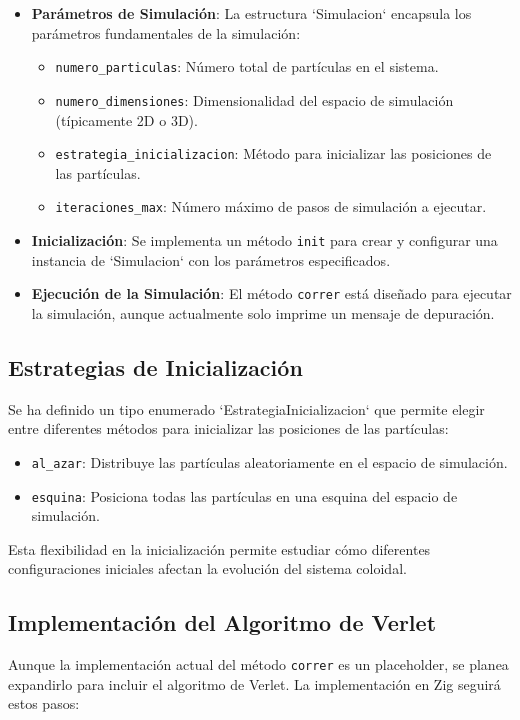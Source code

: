 \documentclass[twocolumn]{article}
\begin{document}
\begin{itemize}
    \item \textbf{Parámetros de Simulación}: La estructura `Simulacion` encapsula los parámetros fundamentales de la simulación:
    \begin{itemize}
        \item \texttt{numero\_particulas}: Número total de partículas en el sistema.
        \item \texttt{numero\_dimensiones}: Dimensionalidad del espacio de simulación (típicamente 2D o 3D).
        \item \texttt{estrategia\_inicializacion}: Método para inicializar las posiciones de las partículas.
        \item \texttt{iteraciones\_max}: Número máximo de pasos de simulación a ejecutar.
    \end{itemize}

    \item \textbf{Inicialización}: Se implementa un método \texttt{init} para crear y configurar una instancia de `Simulacion` con los parámetros especificados.

    \item \textbf{Ejecución de la Simulación}: El método \texttt{correr} está diseñado para ejecutar la simulación, aunque actualmente solo imprime un mensaje de depuración.
\end{itemize}

\subsection*{Estrategias de Inicialización}
Se ha definido un tipo enumerado `EstrategiaInicializacion` que permite elegir entre diferentes métodos para inicializar las posiciones de las partículas:

\begin{itemize}
    \item \texttt{al\_azar}: Distribuye las partículas aleatoriamente en el espacio de simulación.
    \item \texttt{esquina}: Posiciona todas las partículas en una esquina del espacio de simulación.
\end{itemize}

Esta flexibilidad en la inicialización permite estudiar cómo diferentes configuraciones iniciales afectan la evolución del sistema coloidal.

\subsection*{Implementación del Algoritmo de Verlet}
Aunque la implementación actual del método \texttt{correr} es un placeholder, se planea expandirlo para incluir el algoritmo de Verlet. La implementación en Zig seguirá estos pasos:
\end{document}
